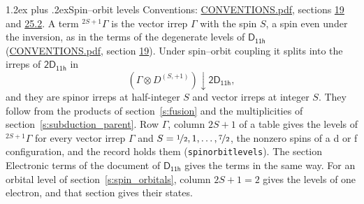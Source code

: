\documentclass[10pt,a4paper]{article}
\makeatletter
\renewcommand\section{\@startsection{section}{1}{\z@}{-3ex plus -1ex minus -.2ex}%
  {1.2ex plus .2ex}{\normalfont\large\sffamily\bfseries\color{parttitle}}}
\numberwithin{equation}{section}
\newcommand{\grp}[1]{\mathsf{#1}}
\newcommand{\restr}[2]{#1\!\downarrow#2}
\newcommand{\irrJp}[2]{D^{(#1,#2)}}
\newcommand{\irrprod}{\otimes}
\newcommand{\term}[2]{{}^{#1}#2}
\makeatother
\begin{document}
\section{Spin--orbit levels}\label{s:spin_orbit}
Conventions: \href{../../CONVENTIONS.pdf}{CONVENTIONS.pdf}, sections \href{../../../rotation/CONVENTIONS.pdf\#conv.19}{19} and \href{../../CONVENTIONS.pdf\#conv.25.2}{25.2}.
\leavevmode\label{n:local.spin}\label{n:symbol.term}A term $\term{2S+1}{\Gamma}$ is the vector irrep $\Gamma$ with the spin $S$, a spin even under the inversion, as in the terms of the degenerate levels of \href{../../../rotation/data/pdf/D11h.pdf}{$\grp{D_{11h}}$} (\href{../../CONVENTIONS.pdf}{CONVENTIONS.pdf}, section \href{../../../rotation/CONVENTIONS.pdf\#conv.19}{19}). Under spin--orbit coupling it splits into the irreps of $\grp{2D_{11h}}$ in
\begin{equation}\label{e:spinorbit}\restr{(\Gamma \irrprod \irrJp{S}{+1})}{\grp{2D_{11h}}},\end{equation}
and they are spinor irreps at half-integer $S$ and vector irreps at integer $S$. They follow from the products of section~\ref{s:fusion} and the multiplicities of section~\ref{s:subduction_parent}. Row $\Gamma$, column $2S + 1$ of a table gives the levels of $\term{2S+1}{\Gamma}$ for every vector irrep $\Gamma$ and $S = \nicefrac{1}{2}, 1, \dots, \nicefrac{7}{2}$, the nonzero spins of a d or f configuration, and the record holds them (\texttt{spinorbitlevels}). The section Electronic terms of the document of \href{../../../rotation/data/pdf/D11h.pdf}{$\grp{D_{11h}}$} gives the terms in the same way. For an orbital level of section~\ref{s:spin_orbitals}, column $2S + 1 = 2$ gives the levels of one electron, and that section gives their states.
\end{document}
